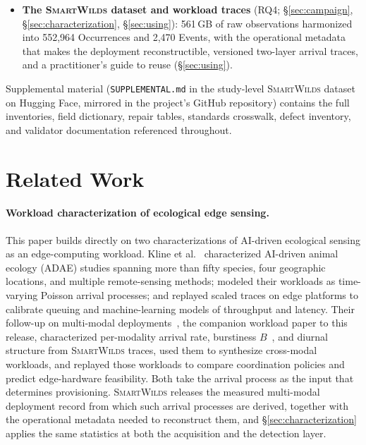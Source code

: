 \documentclass[sigconf]{acmart}
\newcommand{\smartwilds}{\textsc{SmartWilds}\xspace}
\begin{document}
\begin{itemize}
    \item \textbf{The \smartwilds dataset and workload traces}
    (RQ4; \S\ref{sec:campaign}, \S\ref{sec:characterization},
    \S\ref{sec:using}): 561\,GB of raw observations harmonized into
    552{,}964 Occurrences and 2{,}470 Events, with the operational
    metadata that makes the deployment reconstructible, versioned
    two-layer arrival traces, and a practitioner's guide to reuse
    (\S\ref{sec:using}).
\end{itemize}

Supplemental material (\texttt{SUPPLEMENTAL.md} in the study-level
\smartwilds dataset on Hugging Face, mirrored in the project's GitHub
repository) contains the full inventories, field dictionary, repair
tables, standards crosswalk, defect inventory, and validator
documentation referenced throughout.


\section{Related Work}
\label{sec:related}

\paragraph{Workload characterization of ecological edge sensing.}
This paper builds directly on two characterizations of AI-driven
ecological sensing as an edge-computing workload. Kline et
al.~\cite{kline2024characterizing} characterized AI-driven animal
ecology (ADAE) studies spanning more than fifty species, four
geographic locations, and multiple remote-sensing methods; modeled
their workloads as time-varying Poisson arrival processes; and replayed
scaled traces on edge platforms to calibrate queuing and
machine-learning models of throughput and latency. Their follow-up on
multi-modal deployments~\cite{kline2026blueprint}, the companion
workload paper to this release, characterized
per-modality arrival rate, burstiness $B$~\cite{goh2008burstiness}, and
diurnal structure from \smartwilds traces, used them to synthesize
cross-modal workloads, and replayed those workloads to compare
coordination policies and predict edge-hardware feasibility. Both take the arrival process as the input
that determines provisioning. \smartwilds releases the measured
multi-modal deployment record from which such arrival processes are
derived, together with the operational metadata needed to reconstruct
them, and \S\ref{sec:characterization} applies the same statistics at
both the acquisition and the detection layer.
\end{document}

